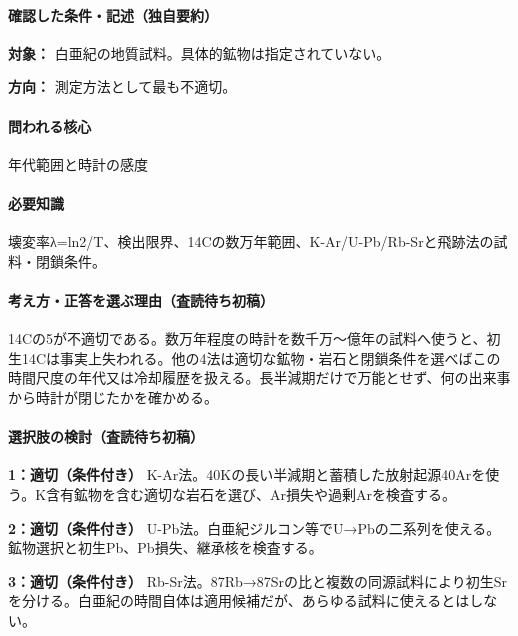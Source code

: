 \paragraph{確認した条件・記述（独自要約）}\mbox{}\par

\noindent\textbf{対象：} 白亜紀の地質試料。具体的鉱物は指定されていない。\par

\noindent\textbf{方向：} 測定方法として最も不適切。\par

\paragraph{問われる核心} 年代範囲と時計の感度

\paragraph{必要知識} 壊変率λ=ln2/T、検出限界、14Cの数万年範囲、K-Ar/U-Pb/Rb-Srと飛跡法の試料・閉鎖条件。

\paragraph{考え方・正答を選ぶ理由（査読待ち初稿）} 14Cの5が不適切である。数万年程度の時計を数千万〜億年の試料へ使うと、初生14Cは事実上失われる。他の4法は適切な鉱物・岩石と閉鎖条件を選べばこの時間尺度の年代又は冷却履歴を扱える。長半減期だけで万能とせず、何の出来事から時計が閉じたかを確かめる。

\paragraph{選択肢の検討（査読待ち初稿）}\mbox{}\par

\noindent\textbf{1：適切（条件付き）} K-Ar法。40Kの長い半減期と蓄積した放射起源40Arを使う。K含有鉱物を含む適切な岩石を選び、Ar損失や過剰Arを検査する。\par

\noindent\textbf{2：適切（条件付き）} U-Pb法。白亜紀ジルコン等でU→Pbの二系列を使える。鉱物選択と初生Pb、Pb損失、継承核を検査する。\par

\noindent\textbf{3：適切（条件付き）} Rb-Sr法。87Rb→87Srの比と複数の同源試料により初生Srを分ける。白亜紀の時間自体は適用候補だが、あらゆる試料に使えるとはしない。\par

